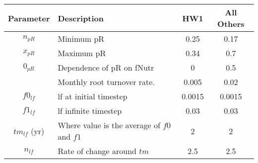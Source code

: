 \begin{tabularx}{\linewidth}{|cXcc|}
\hline
Parameter & Description & HW1 & All Others\\
\hline
 $n_{pR}$ & Minimum \acf{pR} & 0.25 & 0.17\\
 $x_{pR}$ & Maximum \ac{pR} & 0.34 & 0.7\\
 $0_{pR}$ & Dependence of \ac{pR} on \ac{fNutr}  & 0 &  0.5\\
         & Monthly root turnover rate. & 0.005 & 0.02\\
  $f0_{lf}$ & \acf{lf} at initial timestep & 0.0015 & 0.0015\\
  $f1_{lf}$ & \ac{lf} infinite timestep & 0.03 & 0.03\\
  $tm_{lf}$ (yr) & Where value is the average of $f0$ and $f1$ & 2 &2 \\
  $n_{lf}$  & Rate of change around $tm$ & 2.5 & 2.5\\
 \hline
\end{tabularx}
